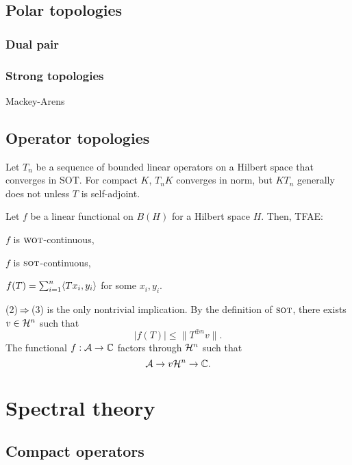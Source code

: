 \documentclass{../note}
\newcommand{\wot}{{\text{\sc wot}}}
\newcommand{\sot}{{\text{\sc sot}}}
\begin{document}
\chapter{Polar topologies}
\section{Dual pair}
\section{Strong topologies}
Mackey-Arens


\chapter{Operator topologies}
\begin{prb}
Let $T_n$ be a sequence of bounded linear operators on a Hilbert space that converges in SOT.
For compact $K$, $T_n K$ converges in norm, but $KT_n$ generally does not unless $T$ is self-adjoint.
\end{prb}

\begin{prb}
Let $f$ be a linear functional on $B(H)$ for a Hilbert space $H$.
Then, TFAE:
\begin{parts}
\item $f$ is $\wot$-continuous,
\item $f$ is $\sot$-continuous,
\item $f(T)=\sum_{i=1}^n\langle Tx_i,y_i\rangle$ for some $x_i,y_i$.
\end{parts}
\end{prb}
\begin{pf}
(2)$\impl$(3) is the only nontrivial implication.
By the definition of $\sot$, there exists $v\in \mathcal{H}^n$ such that
\[|f(T)|\le\|T^{\oplus n}v\|.\]
The functional $f:\mathcal{A}\to\mathbb{C}$ factors through $\mathcal{H}^n$ such that
\[\mathcal{A}\to{v}\mathcal{H}^n\to\mathbb{C}.\]
\end{pf}












\part{Spectral theory}


\chapter{Compact operators}
\end{document}
